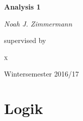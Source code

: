\documentclass[smallheadings,headsepline,12pt,a4paper]{scrartcl}
\begin{document}
\begin{titlepage}
	\centering
	{\huge\bfseries Analysis 1\par}
	\vspace{2cm}
	{\Large\itshape Noah J. Zimmermann\par}
	\vfill
	supervised by\par
	 \textsc{x}

	\vfill

	{\large Wintersemester 2016/17\par}
\end{titlepage}

\tableofcontents

\newpage

\section*{Logik}
\end{document}
